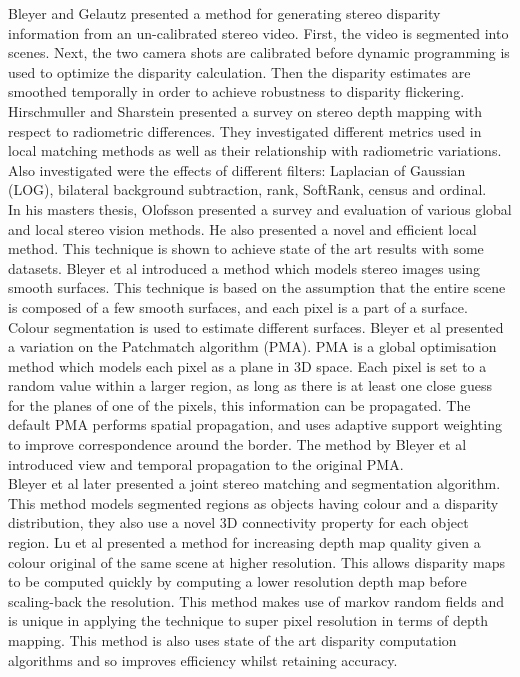 Bleyer and Gelautz \cite{Bleyer09Temporally} presented a method for generating stereo disparity information from an un-calibrated stereo video. First, the video is segmented into scenes. Next, the two camera shots are calibrated before dynamic programming is used to optimize the disparity calculation. Then the disparity estimates are smoothed temporally in order to achieve robustness to disparity flickering. Hirschmuller and Sharstein \cite{Hirschmuller09Evaluation} presented a survey on stereo depth mapping with respect to radiometric differences. They investigated different metrics used in local matching methods as well as their relationship with radiometric variations. Also investigated were the effects of different filters: Laplacian of Gaussian (LOG), bilateral background subtraction, rank, SoftRank, census and ordinal. \\


In his masters thesis, Olofsson \cite{Olofsson10Modern} presented a survey and evaluation of various global and local stereo vision methods. He also presented a novel and efficient local method. This technique is shown to achieve state of the art results with some datasets. Bleyer et al \cite{Bleyer10Surface} introduced a method which models stereo images using smooth surfaces. This technique is based on the assumption that the entire scene is composed of a few smooth surfaces, and each pixel is a part of a surface. Colour segmentation is used to estimate different surfaces. Bleyer et al \cite{Bleyer11Patchmatch} presented a variation on the Patchmatch algorithm (PMA). PMA is a global optimisation method which models each pixel as a plane in 3D space. Each pixel is set to a random value within a larger region, as long as there is at least one close guess for the planes of one of the pixels, this information can be propagated. The default PMA performs spatial propagation, and uses adaptive support weighting to improve correspondence around the border. The method by Bleyer et al introduced view and temporal propagation to the original PMA. \\


Bleyer et al \cite{Bleyer11Object} later presented a joint stereo matching and segmentation algorithm. This method models segmented regions as objects having colour and a disparity distribution, they also use a novel 3D connectivity property for each object region. Lu et al \cite{Lu11Revisit} presented a method for increasing depth map quality given a colour original of the same scene at higher resolution. This allows disparity maps to be computed quickly by computing a lower resolution depth map before scaling-back the resolution. This method makes use of markov random fields and is unique in applying the technique to super pixel resolution in terms of depth mapping. This method is also uses state of the art disparity computation algorithms and so improves efficiency whilst retaining accuracy. \\ 



